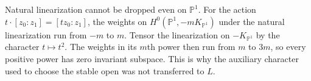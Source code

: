 \begin{remark}\label{rem:character}
Natural linearization cannot be dropped even on $\mathbb P^1$. For the action $t\cdot[z_0:z_1]=[tz_0:z_1]$, the weights on $H^0(\mathbb P^1,-mK_{\mathbb P^1})$ under the natural linearization run from $-m$ to $m$. Tensor the linearization on $-K_{\mathbb P^1}$ by the character $t\mapsto t^2$. The weights in its $m$th power then run from $m$ to $3m$, so every positive power has zero invariant subspace. This is why the auxiliary character used to choose the stable open was not transferred to $L$.
\end{remark}
